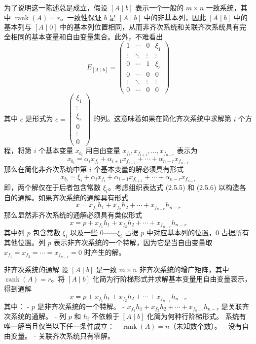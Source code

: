 为了说明这一陈述总是成立，假设 \([A \mid b]\) 表示一个一般的 \(m \times n\) 一致系统，其中 \(\operatorname{rank}(A) = r\)。一致性保证 \(b\) 是 \([A \mid b]\) 中的非基本列，因此 \([A \mid b]\) 中的基本列与 \([A \mid 0]\) 中的基本列位置相同，从而非齐次系统和关联齐次系统具有完全相同的基本变量和自由变量集合。此外，不难看出
\[
E_{[A \mid b]} = \begin{pmatrix} 1 & \cdots & 0 & \xi_{1} \\ \vdots & \ddots & \vdots & \vdots \\ 0 & \cdots & 1 & \xi_{r} \\ 0 & \cdots & 0 & 0 \\ \vdots & \ddots & \vdots & \vdots \\ 0 & \cdots & 0 & 0 \end{pmatrix}
\]
其中 \(c\) 是形式为 \(c = \begin{pmatrix} \xi_{1} \\ \vdots \\ \xi_{r} \\ 0 \\ \vdots \\ 0 \end{pmatrix}\) 的列。这意味着如果在简化齐次系统中求解第 \(i\) 个方程，将第 \(i\) 个基本变量 \(x_{b_{i}}\) 用自由变量 \(x_{f_{i}}, x_{f_{i+1}}, \ldots, x_{f_{n-r}}\) 表示为
\[
x_{b_{i}} = \alpha_{i} x_{f_{i}} + \alpha_{i+1} x_{f_{i+1}} + \cdots + \alpha_{n-r} x_{f_{n-r}}
\]
那么在简化非齐次系统中第 \(i\) 个基本变量的解必须具有形式
\[
x_{b_{i}} = \xi_{i} + \alpha_{i} x_{f_{i}} + \alpha_{i+1} x_{f_{i+1}} + \cdots + \alpha_{n-r} x_{f_{n-r}}
\]
即，两个解仅在于后者包含常数 \(\xi_{i}\)。考虑组织表达式 (2.5.5) 和 (2.5.6) 以构造各自的通解。如果齐次系统的通解具有形式
\[
x = x_{f_{1}} h_{1} + x_{f_{2}} h_{2} + \cdots + x_{f_{n-r}} h_{n-r}
\]
那么显然非齐次系统的通解必须具有类似形式
\[
x = p + x_{f_{1}} h_{1} + x_{f_{2}} h_{2} + \cdots + x_{f_{n-r}} h_{n-r}
\]
其中列 \(p\) 包含常数 \(\xi_{i}\) 以及一些 0——\(\xi_{i}\) 占据 \(p\) 中对应基本列的位置，0 占据所有其他位置。列 \(p\) 表示非齐次系统的一个特解，因为它是当自由变量取 \(x_{f_{1}} = x_{f_{2}} = \cdots = x_{f_{n-r}} = 0\) 时产生的解。

\begin{bluebox}{非齐次系统的通解}
设 \([A \mid b]\) 是一致 \(m \times n\) 非齐次系统的增广矩阵，其中 \(\operatorname{rank}(A) = r\)。将 \([A \mid b]\) 化简为行阶梯形式并求解基本变量用自由变量表示，得到通解
\[
x = p + x_{f_{1}} h_{1} + x_{f_{2}} h_{2} + \cdots + x_{f_{n-r}} h_{n-r}
\]
其中：
- \(p\) 是非齐次系统的一个特解。
- \(x_{f_{1}} h_{1} + x_{f_{2}} h_{2} + \cdots + x_{f_{n-r}} h_{n-r}\) 是关联齐次系统的通解。
- 列 \(p\) 和 \(h_{i}\) 不依赖于 \([A \mid b]\) 化简为何种行阶梯形式。
系统有唯一解当且仅当以下任一条件成立：
- \(\operatorname{rank}(A) = n\)（未知数个数）。
- 没有自由变量。
- 关联齐次系统只有零解。
\end{bluebox}

